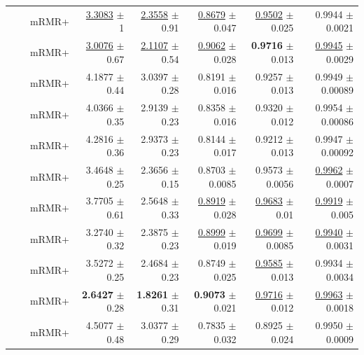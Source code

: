 \begin{longtable}{llp{}rrrrr}
 &  & mRMR+ & \underline{3.3083} {\scriptsize $\pm$ 1} & \underline{2.3558} {\scriptsize $\pm$ 0.91} & \underline{0.8679} {\scriptsize $\pm$ 0.047} & \underline{0.9502} {\scriptsize $\pm$ 0.025} & 0.9944 {\scriptsize $\pm$ 0.0021} \\
 &  & mRMR+ & \underline{3.0076} {\scriptsize $\pm$ 0.67} & \underline{2.1107} {\scriptsize $\pm$ 0.54} & \underline{0.9062} {\scriptsize $\pm$ 0.028} & \textbf{0.9716} {\scriptsize $\pm$ 0.013} & \underline{0.9945} {\scriptsize $\pm$ 0.0029} \\
 &  & mRMR+ & 4.1877 {\scriptsize $\pm$ 0.44} & 3.0397 {\scriptsize $\pm$ 0.28} & 0.8191 {\scriptsize $\pm$ 0.016} & 0.9257 {\scriptsize $\pm$ 0.013} & 0.9949 {\scriptsize $\pm$ 0.00089} \\
 &  & mRMR+ & 4.0366 {\scriptsize $\pm$ 0.35} & 2.9139 {\scriptsize $\pm$ 0.23} & 0.8358 {\scriptsize $\pm$ 0.016} & 0.9320 {\scriptsize $\pm$ 0.012} & 0.9954 {\scriptsize $\pm$ 0.00086} \\
 &  & mRMR+ & 4.2816 {\scriptsize $\pm$ 0.36} & 2.9373 {\scriptsize $\pm$ 0.23} & 0.8144 {\scriptsize $\pm$ 0.017} & 0.9212 {\scriptsize $\pm$ 0.013} & 0.9947 {\scriptsize $\pm$ 0.00092} \\
 &  & mRMR+ & 3.4648 {\scriptsize $\pm$ 0.25} & 2.3656 {\scriptsize $\pm$ 0.15} & 0.8703 {\scriptsize $\pm$ 0.0085} & 0.9573 {\scriptsize $\pm$ 0.0056} & \underline{0.9962} {\scriptsize $\pm$ 0.0007} \\
 &  & mRMR+ & 3.7705 {\scriptsize $\pm$ 0.61} & 2.5648 {\scriptsize $\pm$ 0.33} & \underline{0.8919} {\scriptsize $\pm$ 0.028} & \underline{0.9683} {\scriptsize $\pm$ 0.01} & \underline{0.9919} {\scriptsize $\pm$ 0.005} \\
 &  & mRMR+ & 3.2740 {\scriptsize $\pm$ 0.32} & 2.3875 {\scriptsize $\pm$ 0.23} & \underline{0.8999} {\scriptsize $\pm$ 0.019} & \underline{0.9699} {\scriptsize $\pm$ 0.0085} & \underline{0.9940} {\scriptsize $\pm$ 0.0031} \\
 &  & mRMR+ & 3.5272 {\scriptsize $\pm$ 0.25} & 2.4684 {\scriptsize $\pm$ 0.23} & 0.8749 {\scriptsize $\pm$ 0.025} & \underline{0.9585} {\scriptsize $\pm$ 0.013} & 0.9934 {\scriptsize $\pm$ 0.0034} \\
 &  & mRMR+ & \textbf{2.6427} {\scriptsize $\pm$ 0.28} & \textbf{1.8261} {\scriptsize $\pm$ 0.31} & \textbf{0.9073} {\scriptsize $\pm$ 0.021} & \underline{0.9716} {\scriptsize $\pm$ 0.012} & \underline{0.9963} {\scriptsize $\pm$ 0.0018} \\
 &  & mRMR+ & 4.5077 {\scriptsize $\pm$ 0.48} & 3.0377 {\scriptsize $\pm$ 0.29} & 0.7835 {\scriptsize $\pm$ 0.032} & 0.8925 {\scriptsize $\pm$ 0.024} & 0.9950 {\scriptsize $\pm$ 0.0009} \\

\end{longtable}
